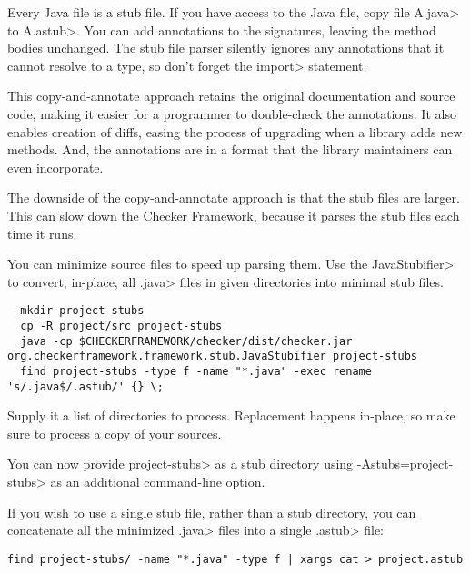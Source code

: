 


Every Java file is a stub file.  If you have access to the Java file,
copy file \<A.java> to \<A.astub>.  You can add
annotations to the signatures, leaving the method bodies unchanged.
The stub file parser silently ignores any annotations that it cannot
resolve to a type, so don't forget the \<import> statement.

This copy-and-annotate approach retains the original
documentation and source code, making it easier for a programmer to
double-check the annotations.  It also enables creation of diffs, easing
the process of upgrading when a library adds new methods.  And, the
annotations are in a format that the library maintainers can even
incorporate.

The downside of the copy-and-annotate approach is that the stub files are
larger.  This can
slow down the Checker Framework, because it parses the stub files each time
it runs.

You can minimize source files to speed up parsing them.
Use the \<JavaStubifier> to convert, in-place, all \<.java> files in given directories into
minimal stub files.

\begin{Verbatim}
  mkdir project-stubs
  cp -R project/src project-stubs
  java -cp $CHECKERFRAMEWORK/checker/dist/checker.jar org.checkerframework.framework.stub.JavaStubifier project-stubs
  find project-stubs -type f -name "*.java" -exec rename 's/.java$/.astub/' {} \;
\end{Verbatim}

Supply it a list of directories to process. Replacement happens in-place, so make sure to
process a copy of your sources.

You can now provide \<project-stubs> as a stub directory using \<-Astubs=project-stubs> as
an additional command-line option.

If you wish to use a single stub file, rather than a stub directory,
you can concatenate all the minimized \<.java> files into a single \<.astub> file:

\begin{Verbatim}
find project-stubs/ -name "*.java" -type f | xargs cat > project.astub
\end{Verbatim}

